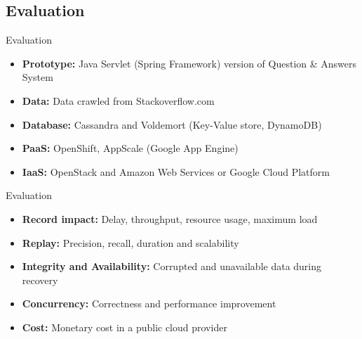 \subsection{Evaluation}
\begin{frame}[t]{Evaluation}
	\begin{itemize}
	 \item \textbf{Prototype:} Java Servlet (Spring Framework) version of Question \& Answers System
	 \item \textbf{Data:} Data crawled from Stackoverflow.com	 	 \item \textbf{Database: }Cassandra and Voldemort (Key-Value store, DynamoDB)
	 \item \textbf{PaaS: }OpenShift, AppScale (Google App Engine) 
	 \item \textbf{IaaS: } OpenStack and Amazon Web Services or Google Cloud Platform
	\end{itemize}    
\end{frame}

\begin{frame}[t]{Evaluation}
	\begin{itemize}
	\item \textbf{Record impact:} Delay, throughput, resource usage, maximum load
	\item \textbf{Replay:} Precision, recall, duration and scalability
	\item \textbf{Integrity and Availability:} Corrupted and unavailable data during recovery
	\item \textbf{Concurrency: }Correctness and performance improvement
	\item \textbf{Cost: }Monetary cost in a public cloud provider
	\end{itemize}
	
\end{frame}
